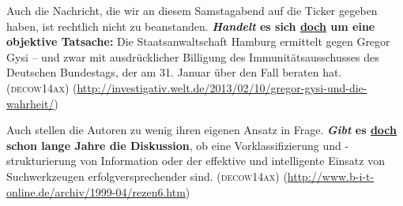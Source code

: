{\begin{exe}
	\ex\label{988} 

	Auch die Nachricht, die wir an diesem Samstagabend auf die Ticker gegeben haben, ist rechtlich nicht zu beanstanden. \textbf{\textit{Handelt} es sich 		\ul{doch} um eine objektive Tatsache:} Die Staatsanwaltschaft Hamburg ermittelt gegen Gregor Gysi – und zwar mit ausdrücklicher Billigung des 		Immunitätsausschusses des Deutschen Bundestags, der am 31. Januar über den Fall beraten hat. 
	\hfill\hbox{\scshape(decow14ax)}
	\newline
	{\scriptsize(\url{http://investigativ.welt.de/2013/02/10/gregor-gysi-und-die-wahrheit/})}
\end{exe} 

\begin{exe}
	\ex\label{989} 

	Auch stellen die Autoren zu wenig ihren eigenen Ansatz in Frage. \textbf{\textit{Gibt} es \ul{doch} schon lange Jahre die Diskussion}, ob eine 		Vorklassifizierung und -strukturierung von Information oder der effektive und intelligente Einsatz von Suchwerkzeugen erfolgversprechender sind.
	\hfill\hbox{\scshape(decow14ax)}
	\newline
	{\scriptsize(\url{http://www.b-i-t-online.de/archiv/1999-04/rezen6.htm})}
\end{exe} 							 

\begin{exe}
	\ex\label{990} 


\end{exe}}
